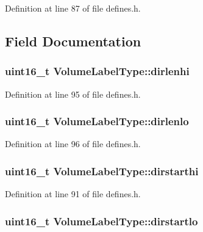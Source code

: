 Definition at line 87 of file defines.\+h.



\subsection{Field Documentation}
\subsubsection[{\texorpdfstring{dirlenhi}{dirlenhi}}]{\setlength{\rightskip}{0pt plus 5cm}uint16\+\_\+t Volume\+Label\+Type\+::dirlenhi}\hypertarget{structVolumeLabelType_a6fa349ef78a7ea0a3006e0c1f4f3a155}{}\label{structVolumeLabelType_a6fa349ef78a7ea0a3006e0c1f4f3a155}


Definition at line 95 of file defines.\+h.

\subsubsection[{\texorpdfstring{dirlenlo}{dirlenlo}}]{\setlength{\rightskip}{0pt plus 5cm}uint16\+\_\+t Volume\+Label\+Type\+::dirlenlo}\hypertarget{structVolumeLabelType_ae1c5205294bf4588b931057d03853d66}{}\label{structVolumeLabelType_ae1c5205294bf4588b931057d03853d66}


Definition at line 96 of file defines.\+h.

\subsubsection[{\texorpdfstring{dirstarthi}{dirstarthi}}]{\setlength{\rightskip}{0pt plus 5cm}uint16\+\_\+t Volume\+Label\+Type\+::dirstarthi}\hypertarget{structVolumeLabelType_aac87a089bec0cf282bf23038937d7635}{}\label{structVolumeLabelType_aac87a089bec0cf282bf23038937d7635}


Definition at line 91 of file defines.\+h.

\subsubsection[{\texorpdfstring{dirstartlo}{dirstartlo}}]{\setlength{\rightskip}{0pt plus 5cm}uint16\+\_\+t Volume\+Label\+Type\+::dirstartlo}\hypertarget{structVolumeLabelType_a193c89f442656a080244f284f1bc008a}{}\label{structVolumeLabelType_a193c89f442656a080244f284f1bc008a}


